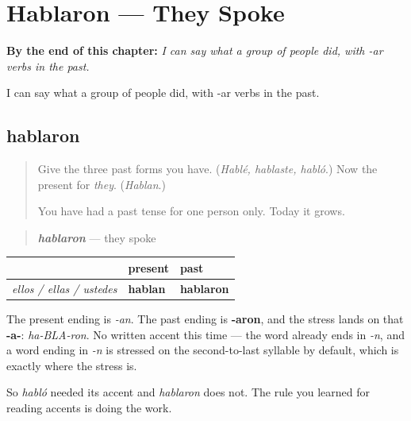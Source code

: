
\chapter{Hablaron --- They Spoke}
\label{ch:hablaron}

\begin{chapteropening}
\textbf{By the end of this chapter:} \emph{I can say what a group of people did, with -ar verbs in the past.}

I can say what a group of people did, with -ar verbs in the past.
\end{chapteropening}

\section[hablaron]{hablaron}

\label{lesson:ES-C55-hablaron}



\begin{quote}
Give the three past forms you have. (\emph{Hablé, hablaste, habló}.) Now the present for \emph{they}. (\emph{Hablan}.)

You have had a past tense for one person only. Today it grows.
\end{quote}

\begin{grammarlens}[title={Grammar Lens: they, in the past}]
\begin{quote}
\emph{\textbf{hablaron}} — they spoke
\end{quote}

\noindent
\begin{tabularx}{\linewidth}{@{}>{\raggedright\arraybackslash}X>{\raggedright\arraybackslash}X>{\raggedright\arraybackslash}X@{}}
\toprule
\textbf{} & \textbf{present} & \textbf{past} \\
\midrule
\emph{ellos / ellas / ustedes} & \textbf{hablan} & \textbf{hablaron} \\
\bottomrule
\end{tabularx}

The present ending is \emph{-an}. The past ending is \textbf{-aron}, and the stress lands on that \textbf{-a-}: \emph{ha-BLA-ron}. No written accent this time — the word already ends in \emph{-n}, and a word ending in \emph{-n} is stressed on the second-to-last syllable by default, which is exactly where the stress is.

So \emph{habló} needed its accent and \emph{hablaron} does not. The rule you learned for reading accents is doing the work.
\end{grammarlens}

